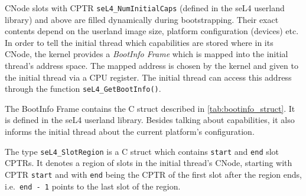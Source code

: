 CNode slots with CPTR \texttt{seL4\_NumInitialCaps} (defined in the seL4
userland library) and above are filled dynamically during
bootstrapping. Their exact contents depend on the userland image size,
platform configuration (devices) etc. In order to tell the initial thread
which capabilities are stored where in its CNode, the kernel provides
a \emph{BootInfo Frame} which is mapped into the initial thread's address
space. The mapped address is chosen by the kernel and given to the initial
thread via a CPU register. The initial thread can access this address
through the function \texttt{seL4\_GetBootInfo()}.

The BootInfo Frame contains the C struct described in
\autoref{tab:bootinfo_struct}.
It is defined in the seL4 userland library. Besides talking about
capabilities, it also informs the initial thread about
the current platform's configuration.

The type \texttt{seL4\_SlotRegion} is a C struct
which contains \texttt{start} and \texttt{end} slot CPTRs. It denotes a region
of slots in the initial thread's CNode, starting with CPTR \texttt{start} and with
\texttt{end} being the CPTR of the first slot after the region ends, i.e.\
\texttt{end - 1} points to the last slot of the region.

